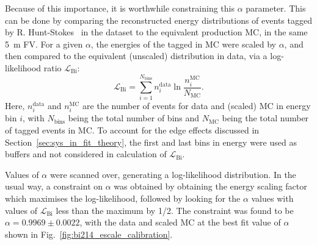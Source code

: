 Because of this importance, it is worthwhile constraining this $\alpha$ parameter. This can be done by comparing the reconstructed energy distributions of  events tagged by R. Hunt-Stokes~\cite{} %
in the dataset to the equivalent production MC, in the same \SI{5}{\m} FV. For a given $\alpha$, the energies of the tagged  in MC were scaled by $\alpha$, and then compared to the equivalent (unscaled) distribution in data, via a log-likelihood ratio $\mathcal{L}_{\mathrm{Bi}}$:
\begin{equation}
    \mathcal{L}_{\mathrm{Bi}} = 
    \sum_{i=1}^{N_{\mathrm{bins}}}
        n_{i}^{\mathrm{data}}\ln{\frac{n_{i}^{\mathrm{MC}}}{N_{\mathrm{MC}}}}.
\end{equation}
Here, $n_{i}^{\mathrm{data}}$ and $n_{i}^{\mathrm{MC}}$ are the number of events for data and (scaled) MC in energy bin $i$, with $N_{\mathrm{bins}}$ being the total number of bins and $N_{\mathrm{MC}}$ being the total number of tagged events in MC. To account for the edge effects discussed in Section~\ref{sec:sys_in_fit_theory}, the first and last bins in energy were used as buffers and not considered in calculation of $\mathcal{L}_{\mathrm{Bi}}$.

Values of $\alpha$ were scanned over, generating a log-likelihood distribution. In the usual way, a constraint on $\alpha$ was obtained by obtaining the energy scaling factor which maximises the log-likelihood, followed by looking for the $\alpha$ values with values of $\mathcal{L}_{\mathrm{Bi}}$ less than the maximum by 1/2. The constraint was found to be $\alpha = 0.9969\pm0.0022$, with the data and scaled MC at the best fit value of $\alpha$ shown in Fig.~\ref{fig:bi214_escale_calibration}.

